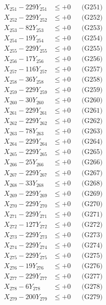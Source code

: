 \documentclass[a4paper,10pt]{article}
\begin{document}
{\begin{align}
\allowbreak
X_{251} - 229Y_{251} &\leq +0 && \text{(G251)} \\
X_{252} - 229Y_{252} &\leq +0 && \text{(G252)} \\
X_{253} - 82Y_{253} &\leq +0 && \text{(G253)} \\
X_{254} - 19Y_{254} &\leq +0 && \text{(G254)} \\
X_{255} - 229Y_{255} &\leq +0 && \text{(G255)} \\
X_{256} - 17Y_{256} &\leq +0 && \text{(G256)} \\
X_{257} - 116Y_{257} &\leq +0 && \text{(G257)} \\
X_{258} - 36Y_{258} &\leq +0 && \text{(G258)} \\
X_{259} - 229Y_{259} &\leq +0 && \text{(G259)} \\
X_{260} - 30Y_{260} &\leq +0 && \text{(G260)} \\
\allowbreak
X_{261} - 229Y_{261} &\leq +0 && \text{(G261)} \\
X_{262} - 229Y_{262} &\leq +0 && \text{(G262)} \\
X_{263} - 78Y_{263} &\leq +0 && \text{(G263)} \\
X_{264} - 229Y_{264} &\leq +0 && \text{(G264)} \\
X_{265} - 229Y_{265} &\leq +0 && \text{(G265)} \\
X_{266} - 25Y_{266} &\leq +0 && \text{(G266)} \\
X_{267} - 229Y_{267} &\leq +0 && \text{(G267)} \\
X_{268} - 33Y_{268} &\leq +0 && \text{(G268)} \\
X_{269} - 229Y_{269} &\leq +0 && \text{(G269)} \\
X_{270} - 229Y_{270} &\leq +0 && \text{(G270)} \\
\allowbreak
X_{271} - 229Y_{271} &\leq +0 && \text{(G271)} \\
X_{272} - 127Y_{272} &\leq +0 && \text{(G272)} \\
X_{273} - 229Y_{273} &\leq +0 && \text{(G273)} \\
X_{274} - 229Y_{274} &\leq +0 && \text{(G274)} \\
X_{275} - 229Y_{275} &\leq +0 && \text{(G275)} \\
X_{276} - 19Y_{276} &\leq +0 && \text{(G276)} \\
X_{277} - 229Y_{277} &\leq +0 && \text{(G277)} \\
X_{278} - 6Y_{278} &\leq +0 && \text{(G278)} \\
X_{279} - 200Y_{279} &\leq +0 && \text{(G279)} \\

\end{align}}
\end{document}
